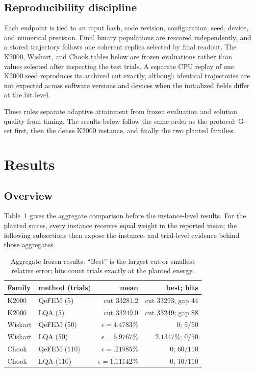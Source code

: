 \documentclass[
  aps,
  prx,
  reprint,
  amsmath,
  amssymb,
  groupedaddress,
  nofootinbib,
  floatfix,
  longbibliography
]{revtex4-2}
\newcommand{\qefem}{QeFEM}
\newcommand{\lqa}{\textsc{LQA}}
\begin{document}
\subsection{Reproducibility discipline}

Each endpoint is tied to an input hash, code revision, configuration, seed,
device, and numerical precision.  Final binary populations are rescored
independently, and a stored trajectory follows one coherent replica selected
by final readout.  The K2000, Wishart, and Chook tables below are frozen
evaluations rather than values selected after inspecting the test trials.  A
separate CPU replay of one K2000 seed reproduces its archived cut exactly,
although identical trajectories are not expected across software versions
and devices when the initialized fields differ at the bit level.

These rules separate adaptive attainment from frozen evaluation and solution
quality from timing.  The results below follow the same order as the protocol:
G-set first, then the dense K2000 instance, and finally the two planted
families.

\section{Results}
\label{sec:results}

\subsection{Overview}

Table~\ref{tab:results-overview} gives the aggregate comparison before the
instance-level results.  For the planted suites, every instance receives equal
weight in the reported mean; the following subsections then expose the
instance- and trial-level evidence behind those aggregates.

\begin{table}[h]
\caption{Aggregate frozen results.  ``Best'' is the largest cut or smallest
relative error; hits count trials exactly at the planted energy.}
\label{tab:results-overview}
\centering
\scriptsize
\setlength{\tabcolsep}{3pt}
\begin{tabular}{llrr}
\toprule
Family & method (trials) & mean & best; hits \\
\midrule
K2000 & \qefem{} (5) & cut 33281.2 & cut 33293; gap 44 \\
K2000 & \lqa{} (5) & cut 33249.0 & cut 33249; gap 88 \\
Wishart & \qefem{} (50) & $\epsilon=4.4783\%$ & $0$; $5/50$ \\
Wishart & \lqa{} (50) & $\epsilon=6.9767\%$ & $2.1347\%$; $0/50$ \\
Chook & \qefem{} (110) & $\epsilon=.21985\%$ & $0$; $60/110$ \\
Chook & \lqa{} (110) & $\epsilon=1.11142\%$ & $0$; $10/110$ \\
\bottomrule
\end{tabular}
\end{table}
\end{document}

